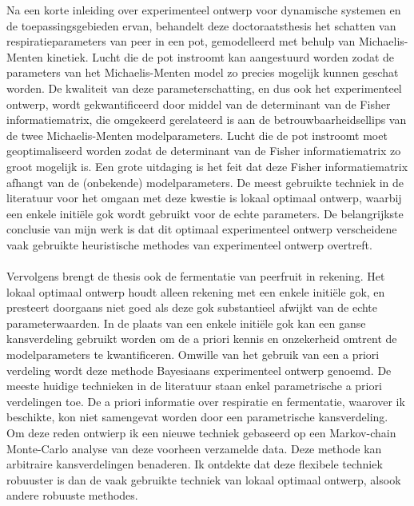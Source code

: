 {\color{red}Na een korte inleiding over experimenteel ontwerp voor dynamische systemen en de toepassingsgebieden ervan}, behandelt deze doctoraatsthesis het schatten van respiratieparameters van peer in een pot, gemodelleerd met behulp van Michaelis-Menten kinetiek. Lucht die de pot instroomt kan aangestuurd worden zodat de parameters van het Michaelis-Menten model zo precies mogelijk kunnen geschat worden. De kwaliteit van deze parameterschatting, en dus ook het experimenteel ontwerp, wordt gekwantificeerd door middel van de determinant van de Fisher informatiematrix, die omgekeerd gerelateerd is aan de betrouwbaarheidsellips van de twee Michaelis-Menten modelparameters. Lucht die de pot instroomt moet geoptimaliseerd worden zodat de determinant van de Fisher informatiematrix zo groot mogelijk is. Een grote uitdaging is het feit dat deze Fisher informatiematrix afhangt van de (onbekende) modelparameters. De meest gebruikte techniek in de literatuur voor het omgaan met deze kwestie is lokaal optimaal ontwerp, waarbij een enkele initiële gok wordt gebruikt voor de echte parameters. De belangrijkste conclusie van mijn werk is dat dit optimaal experimenteel ontwerp verscheidene vaak gebruikte heuristische methodes van experimenteel ontwerp overtreft.
\\
\\
{\color{red}Vervolgens brengt de thesis ook de fermentatie van peerfruit in rekening}. Het lokaal optimaal ontwerp houdt alleen rekening met een enkele initiële gok, en presteert doorgaans niet goed als deze gok substantieel afwijkt van de echte parameterwaarden. In de plaats van een enkele initiële gok kan een ganse kansverdeling gebruikt worden om de a priori kennis en onzekerheid omtrent de modelparameters te kwantificeren. Omwille van het gebruik van een a priori verdeling wordt deze methode Bayesiaans experimenteel ontwerp genoemd. De meeste huidige technieken in de literatuur staan enkel parametrische a priori verdelingen toe. De a priori informatie over respiratie en fermentatie, waarover ik beschikte, kon niet samengevat worden door een parametrische kansverdeling. Om deze reden ontwierp ik een nieuwe techniek gebaseerd op een Markov-chain Monte-Carlo analyse van deze voorheen verzamelde data. Deze methode kan arbitraire kansverdelingen benaderen. Ik ontdekte dat deze flexibele techniek robuuster is dan de vaak gebruikte techniek van lokaal optimaal ontwerp, {\color{red}alsook andere robuuste methodes}.
\\
\\
